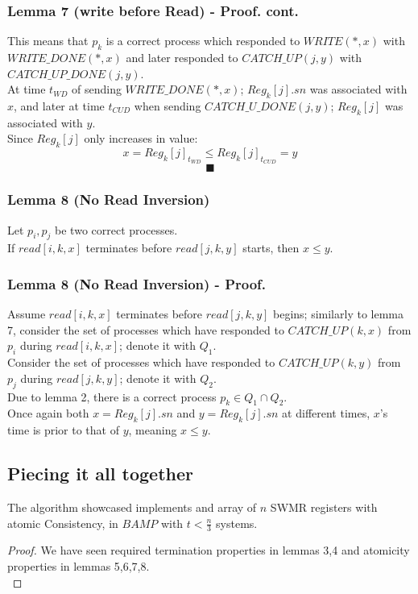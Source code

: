 \begin{frame}
    \frametitle{Lemma 7 (write before Read) - Proof. cont.}
    This means that $p_k$ is a \alert{correct process} which responded to
    $WRITE(*,x)$ with $WRITE\_DONE(*,x)$ and \alert{later} responded to $CATCH\_UP(j,y)$ with
    $CATCH\_UP\_DONE(j,y)$.\\
    At time $t_{WD}$ of sending $WRITE\_DONE(*,x)$; $Reg_k[j].sn$ was associated
    with $x$, and later at time $t_{CUD}$ when sending $CATCH\_U\_DONE(j,y)$; $Reg_k[j]$ was associated
    with $y$.\\
    Since $Reg_k[j]$ only increases in value:
    \[
        x=Reg_k[j]_{t_{WD}}\leq Reg_k[j]_{t_{CUD}}=y    
    \]
    \[\blacksquare \]
\end{frame}

\begin{frame}
    \frametitle{Lemma 8 (No Read Inversion)}
    \begin{lemma}
        Let $p_i, p_j$ be two correct processes.\\
        If $read[i,k,x]$ terminates before $read[j,k,y]$ starts, then $x\leq y$.
    \end{lemma}
\end{frame}
\begin{frame}
    \frametitle{Lemma 8 (No Read Inversion) - Proof.}
    Assume $read[i,k,x]$ terminates before $read[j,k,y]$
    begins; similarly to lemma 7,
    consider the set of processes which have responded to
    $CATCH\_UP(k, x)$ from $p_i$ during $read[i,k,x]$; denote it with $Q_1$.\\
    Consider the set of processes which have responded to
    $CATCH\_UP(k,y)$ from $p_j$ during $read[j,k,y]$; denote it with $Q_2$.\\
    Due to lemma 2, there is a correct process $p_k\in Q_1\cap Q_2$.\\
    Once again both $x=Reg_k[j].sn$ and $y=Reg_k[j].sn$ at different times,
    $x$'s time is prior to that of $y$,
    meaning $x\leq y$.
\end{frame}

\subsection{Piecing it all together}
\begin{frame}
    \begin{theorem}
        The algorithm showcased implements and array of $n$ SWMR
        registers with atomic Consistency, in $BAMP$ with $t<\frac{n}{3}$ systems.
    \end{theorem}
    \begin{proof}
        We have seen required termination properties in lemmas 3,4 and atomicity
        properties in lemmas 5,6,7,8.\\
    \end{proof}
\end{frame}

